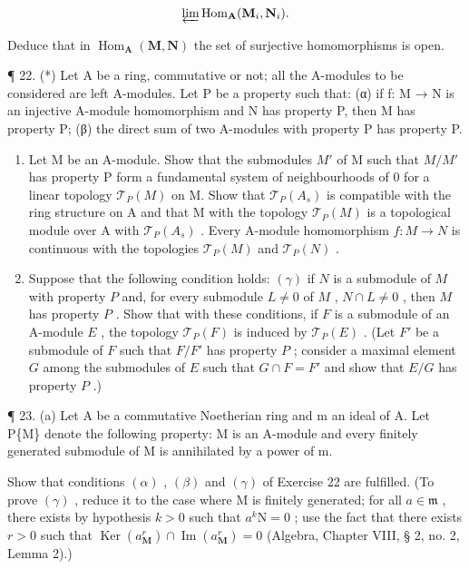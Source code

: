 \[
\varprojlim \operatorname{Hom} _ {\mathbf {A}} (\mathbf {M} _ {i}, \mathbf {N} _ {i}).
\]

Deduce that in \(\operatorname{Hom}_{\mathbf{A}}(\mathbf{M},\mathbf{N})\) the set of surjective homomorphisms is open.

¶ 22. (*) Let A be a ring, commutative or not; all the A-modules to be considered are left A-modules. Let P be a property such that: (α) if f: M → N is an injective A-module homomorphism and N has property P, then M has property P; (β) the direct sum of two A-modules with property P has property P.

\begin{enumerate}
\def\labelenumi{(\alph{enumi})}
\item
  Let M be an A-module. Show that the submodules \(M'\) of M such that \(M/M'\) has property P form a fundamental system of neighbourhoods of 0 for a linear topology \(\mathcal{T}_{P}(M)\) on M. Show that \(\mathcal{T}_{P}(A_{s})\) is compatible with the ring structure on A and that M with the topology \(\mathcal{T}_{P}(M)\) is a topological module over A with \(\mathcal{T}_{P}(A_{s})\) . Every A-module homomorphism \(f: M \to N\) is continuous with the topologies \(\mathcal{T}_{P}(M)\) and \(\mathcal{T}_{P}(N)\) .
\item
  Suppose that the following condition holds: \((\gamma)\) if \(N\) is a submodule of \(M\) with property \(P\) and, for every submodule \(L \neq 0\) of \(M\) , \(N \cap L \neq 0\) , then \(M\) has property \(P\) . Show that with these conditions, if \(F\) is a submodule of an A-module \(E\) , the topology \(\mathcal{T}_P(F)\) is induced by \(\mathcal{T}_P(E)\) . (Let \(F'\) be a submodule of \(F\) such that \(F/F'\) has property \(P\) ; consider a maximal element \(G\) among the submodules of \(E\) such that \(G \cap F = F'\) and show that \(E/G\) has property \(P\) .)
\end{enumerate}

¶ 23. (a) Let A be a commutative Noetherian ring and m an ideal of A. Let P\{M\} denote the following property: M is an A-module and every finitely generated submodule of M is annihilated by a power of m.

Show that conditions \((\alpha)\) , \((\beta)\) and \((\gamma)\) of Exercise 22 are fulfilled. (To prove \((\gamma)\) , reduce it to the case where M is finitely generated; for all \(a \in \mathfrak{m}\) , there exists by hypothesis \(k > 0\) such that \(a^k\mathrm{N} = 0\) ; use the fact that there exists \(r > 0\) such that \(\operatorname{Ker}(a_{\mathbf{M}}^r) \cap \operatorname{Im}(a_{\mathbf{M}}^r) = 0\) (Algebra, Chapter VIII, § 2, no. 2, Lemma 2).)

